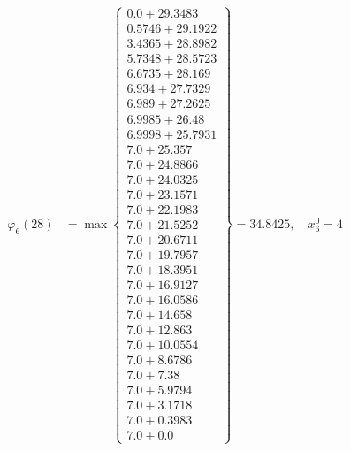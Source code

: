 \documentclass{article}
\begin{document}
\begin{align*}
\varphi_{6}(28) &= \max \left\{ \begin{array}{c}
0.0 + 29.3483 \\
 0.5746 + 29.1922 \\
 3.4365 + 28.8982 \\
 5.7348 + 28.5723 \\
 6.6735 + 28.169 \\
 6.934 + 27.7329 \\
 6.989 + 27.2625 \\
 6.9985 + 26.48 \\
 6.9998 + 25.7931 \\
 7.0 + 25.357 \\
 7.0 + 24.8866 \\
 7.0 + 24.0325 \\
 7.0 + 23.1571 \\
 7.0 + 22.1983 \\
 7.0 + 21.5252 \\
 7.0 + 20.6711 \\
 7.0 + 19.7957 \\
 7.0 + 18.3951 \\
 7.0 + 16.9127 \\
 7.0 + 16.0586 \\
 7.0 + 14.658 \\
 7.0 + 12.863 \\
 7.0 + 10.0554 \\
 7.0 + 8.6786 \\
 7.0 + 7.38 \\
 7.0 + 5.9794 \\
 7.0 + 3.1718 \\
 7.0 + 0.3983 \\
 7.0 + 0.0
\end{array} \right\}=34.8425, \quad x_{6}^0=4\\
  

\end{align*}
\end{document}
